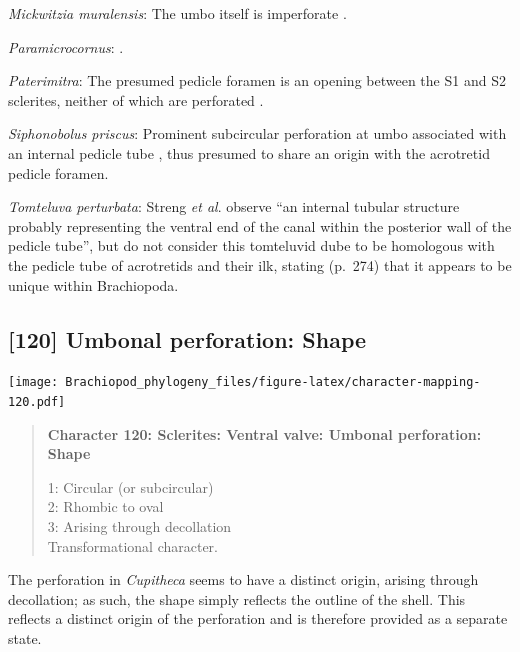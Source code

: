 \documentclass[openany]{book}
\begin{document}
\hypertarget{Mickwitzia_muralensis-coding-119}{}
\emph{Mickwitzia muralensis}: The umbo itself is imperforate
\citep{Balthasar2004Shellstructure}.

\hypertarget{Paramicrocornus-coding-119}{}
\emph{Paramicrocornus}: \citet{Zhang2018Ahyolithid}.

\hypertarget{Paterimitra-coding-119}{}
\emph{Paterimitra}: The presumed pedicle foramen is an opening between
the S1 and S2 sclerites, neither of which are perforated
\citep{Skovsted2009Thescleritome}.

\hypertarget{Siphonobolus_priscus-coding-119}{}
\emph{Siphonobolus priscus}: Prominent subcircular perforation at umbo
associated with an internal pedicle tube \citep{Popov2009Earlyontogeny},
thus presumed to share an origin with the acrotretid pedicle foramen.

\hypertarget{Tomteluva_perturbata-coding-119}{}
\emph{Tomteluva perturbata}: Streng \emph{et al}.
\citeyearpar{Streng2016Anew} observe ``an internal tubular structure
probably representing the ventral end of the canal within the posterior
wall of the pedicle tube'', but do not consider this tomteluvid dube to
be homologous with the pedicle tube of acrotretids and their ilk,
stating (p.~274) that it appears to be unique within Brachiopoda.

\subsection*{{[}120{]} Umbonal perforation:
Shape}\label{umbonal-perforation-shape}

\texttt{[image: Brachiopod\_phylogeny\_files/figure-latex/character-mapping-120.pdf]}

\begin{quote}
\textbf{Character 120: Sclerites: Ventral valve: Umbonal perforation:
Shape}

1: Circular (or subcircular)\\
2: Rhombic to oval\\
3: Arising through decollation\\
Transformational character.
\end{quote}

The perforation in \emph{Cupitheca} seems to have a distinct origin,
arising through decollation; as such, the shape simply reflects the
outline of the shell. This reflects a distinct origin of the perforation
and is therefore provided as a separate state.
\end{document}
